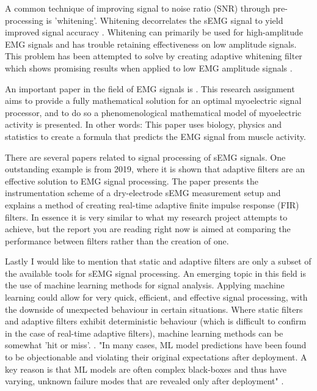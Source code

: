 A common technique of improving signal to noise ratio (SNR) through pre-processing is 'whitening'. Whitening decorrelates the sEMG signal to yield improved signal accuracy \cite{emg_whitening}. 
Whitening can primarily be used for high-amplitude EMG signals and has trouble retaining effectiveness on low amplitude signals. This problem has been attempted to solve by creating adaptive whitening filter which shows promising results when applied to low EMG amplitude signals \cite{adaptive_whitening}. 

An important paper in the field of EMG signals is \cite{optimal_myoprocessor}. This research assignment aims to provide a fully mathematical solution for an optimal myoelectric signal processor, and to do so a phenomenological mathematical model of myoelectric activity is presented. In other words: This paper uses biology, physics and statistics to create a formula that predicts the EMG signal from muscle activity.

There are several papers related to signal processing of sEMG signals.
One outstanding example is \cite{adaptive_filter_dry_electrode} from 2019, where it is shown that adaptive filters are an effective solution to EMG signal processing. The paper presents the instrumentation scheme of a dry-electrode sEMG measurement setup and explains a method of creating real-time adaptive finite impulse response (FIR) filters. In essence it is very similar to what my research project attempts to achieve, but the report you are reading right now is aimed at comparing the performance between filters rather than the creation of one.

Lastly I would like to mention that static and adaptive filters are only a subset of the available tools for sEMG signal processing. An emerging topic in this field is the use of machine learning methods for signal analysis. Applying machine learning could allow for very quick, efficient, and effective signal processing, with the downside of unexpected behaviour in certain situations. Where static filters and adaptive filters exhibit deterministic behaviour (which is difficult to confirm in the case of real-time adaptive filters), machine learning methods can be somewhat 'hit or miss'. \cite{ml_semg_processing_1}.
\cite{ml_semg_processing_2}
"In many cases, ML model predictions have been found to be objectionable and violating their original expectations after deployment. A key reason is that ML models are often complex black-boxes and thus have varying, unknown failure modes that are revealed only after deployment" \cite{microsoft_machine_learning_reliable}.

